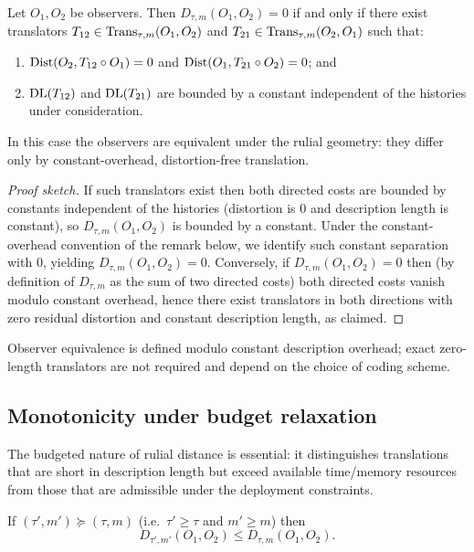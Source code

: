 \documentclass{aion}
\begin{document}
\begin{corollary}\label{cor:observer-equivalence}
Let $O_1,O_2$ be observers.
Then $D_{\tau,m}(O_1,O_2)=0$ if and only if there exist translators
$T_{12}\in\operatorname{Trans}_{\tau,m}(O_1,O_2)$ and $T_{21}\in\operatorname{Trans}_{\tau,m}(O_2,O_1)$ such that:
\begin{enumerate}[leftmargin=*]
  \item $\operatorname{Dist}(O_2, T_{12}\circ O_1)=0$ and $\operatorname{Dist}(O_1, T_{21}\circ O_2)=0$; and
  \item $\operatorname{DL}(T_{12})$ and $\operatorname{DL}(T_{21})$ are bounded by a constant independent of the histories under consideration.
\end{enumerate}
In this case the observers are equivalent under the rulial geometry: they differ only by constant-overhead,
distortion-free translation.
\end{corollary}

\begin{proof}[Proof sketch]
If such translators exist then both directed costs are bounded by constants independent of the histories (distortion is $0$ and description length is constant),
so $D_{\tau,m}(O_1,O_2)$ is bounded by a constant.
Under the constant-overhead convention of the remark below, we identify such constant separation with $0$, yielding $D_{\tau,m}(O_1,O_2)=0$.
Conversely, if $D_{\tau,m}(O_1,O_2)=0$ then (by definition of $D_{\tau,m}$ as the sum of two directed costs)
both directed costs vanish modulo constant overhead, hence there exist translators in both directions with
zero residual distortion and constant description length, as claimed.
\end{proof}

\begin{remark}
Observer equivalence is defined modulo constant description overhead; exact zero-length translators are not required and depend on the choice of coding scheme.
\end{remark}

\subsection{Monotonicity under budget relaxation}
\label{subsec:rulial-monotone}

The budgeted nature of rulial distance is essential: it distinguishes translations that are short in description length
but exceed available time/memory resources from those that are admissible under the deployment constraints.

\begin{proposition}\label{prop:budget-monotone}
If $(\tau',m')\succeq(\tau,m)$ (i.e.\ $\tau'\ge\tau$ and $m'\ge m$) then
\[
  D_{\tau',m'}(O_1,O_2) \le D_{\tau,m}(O_1,O_2).
\]
\end{proposition}
\end{document}
